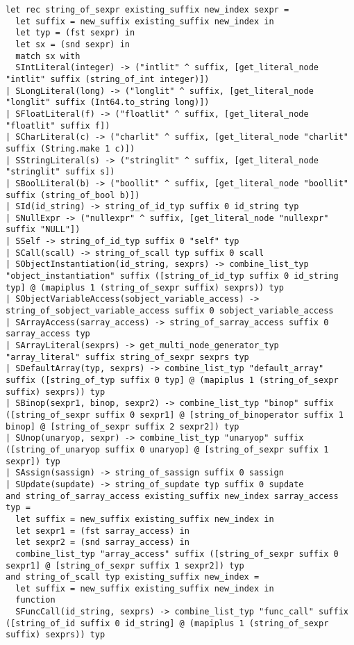 \documentclass{article}
\begin{document}
\begin{verbatim}
let rec string_of_sexpr existing_suffix new_index sexpr =
  let suffix = new_suffix existing_suffix new_index in
  let typ = (fst sexpr) in
  let sx = (snd sexpr) in
  match sx with
  SIntLiteral(integer) -> ("intlit" ^ suffix, [get_literal_node "intlit" suffix (string_of_int integer)])
| SLongLiteral(long) -> ("longlit" ^ suffix, [get_literal_node "longlit" suffix (Int64.to_string long)])
| SFloatLiteral(f) -> ("floatlit" ^ suffix, [get_literal_node "floatlit" suffix f])
| SCharLiteral(c) -> ("charlit" ^ suffix, [get_literal_node "charlit" suffix (String.make 1 c)])
| SStringLiteral(s) -> ("stringlit" ^ suffix, [get_literal_node "stringlit" suffix s])
| SBoolLiteral(b) -> ("boollit" ^ suffix, [get_literal_node "boollit" suffix (string_of_bool b)])
| SId(id_string) -> string_of_id_typ suffix 0 id_string typ
| SNullExpr -> ("nullexpr" ^ suffix, [get_literal_node "nullexpr" suffix "NULL"])
| SSelf -> string_of_id_typ suffix 0 "self" typ
| SCall(scall) -> string_of_scall typ suffix 0 scall
| SObjectInstantiation(id_string, sexprs) -> combine_list_typ "object_instantiation" suffix ([string_of_id_typ suffix 0 id_string typ] @ (mapiplus 1 (string_of_sexpr suffix) sexprs)) typ
| SObjectVariableAccess(sobject_variable_access) -> string_of_sobject_variable_access suffix 0 sobject_variable_access
| SArrayAccess(sarray_access) -> string_of_sarray_access suffix 0 sarray_access typ
| SArrayLiteral(sexprs) -> get_multi_node_generator_typ "array_literal" suffix string_of_sexpr sexprs typ
| SDefaultArray(typ, sexprs) -> combine_list_typ "default_array" suffix ([string_of_typ suffix 0 typ] @ (mapiplus 1 (string_of_sexpr suffix) sexprs)) typ
| SBinop(sexpr1, binop, sexpr2) -> combine_list_typ "binop" suffix ([string_of_sexpr suffix 0 sexpr1] @ [string_of_binoperator suffix 1 binop] @ [string_of_sexpr suffix 2 sexpr2]) typ
| SUnop(unaryop, sexpr) -> combine_list_typ "unaryop" suffix ([string_of_unaryop suffix 0 unaryop] @ [string_of_sexpr suffix 1 sexpr]) typ
| SAssign(sassign) -> string_of_sassign suffix 0 sassign
| SUpdate(supdate) -> string_of_supdate typ suffix 0 supdate
and string_of_sarray_access existing_suffix new_index sarray_access typ =
  let suffix = new_suffix existing_suffix new_index in
  let sexpr1 = (fst sarray_access) in
  let sexpr2 = (snd sarray_access) in
  combine_list_typ "array_access" suffix ([string_of_sexpr suffix 0 sexpr1] @ [string_of_sexpr suffix 1 sexpr2]) typ
and string_of_scall typ existing_suffix new_index =
  let suffix = new_suffix existing_suffix new_index in
  function
  SFuncCall(id_string, sexprs) -> combine_list_typ "func_call" suffix ([string_of_id suffix 0 id_string] @ (mapiplus 1 (string_of_sexpr suffix) sexprs)) typ

\end{verbatim}
\end{document}
